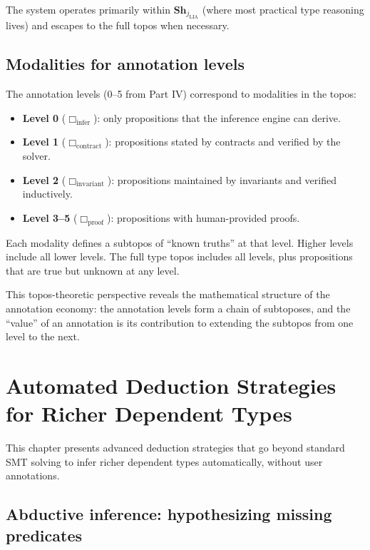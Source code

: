 \documentclass[11pt]{report}
\theoremstyle{definition}
\theoremstyle{plain}
\begin{document}
The system operates primarily within $\mathbf{Sh}_{j_{\mathrm{LIA}}}$ (where
most practical type reasoning lives) and escapes to the full topos when
necessary.

\section{Modalities for annotation levels}

The annotation levels (0--5 from Part IV) correspond to modalities in the
topos:

\begin{itemize}[nosep]
  \item \textbf{Level 0} ($\Box_{\mathrm{infer}}$): only propositions that
        the inference engine can derive.
  \item \textbf{Level 1} ($\Box_{\mathrm{contract}}$): propositions stated by
        contracts and verified by the solver.
  \item \textbf{Level 2} ($\Box_{\mathrm{invariant}}$): propositions
        maintained by invariants and verified inductively.
  \item \textbf{Level 3--5} ($\Box_{\mathrm{proof}}$): propositions with
        human-provided proofs.
\end{itemize}

Each modality defines a subtopos of ``known truths'' at that level. Higher
levels include all lower levels. The full type topos includes all levels,
plus propositions that are true but unknown at any level.

This topos-theoretic perspective reveals the mathematical structure of the
annotation economy: the annotation levels form a chain of subtoposes, and the
``value'' of an annotation is its contribution to extending the subtopos from
one level to the next.


\chapter{Automated Deduction Strategies for Richer Dependent Types}

This chapter presents advanced deduction strategies that go beyond standard
SMT solving to infer richer dependent types automatically, without user
annotations.

\section{Abductive inference: hypothesizing missing predicates}
\end{document}

